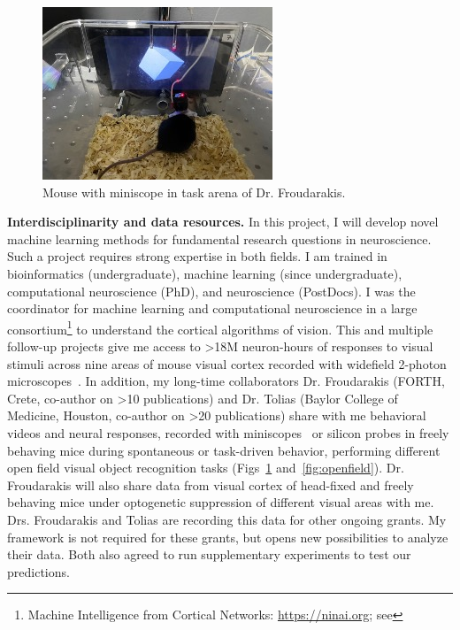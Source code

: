 \documentclass[COG,11pt]{ercgrant}
\begin{document}
\begin{figure}
\vspace{-1.8ex}
\includegraphics[width=\linewidth,trim=25 15 10 30, clip]{figures/miniscope.jpg}
\caption{Mouse with miniscope in task arena of Dr. Froudarakis.}
\label{fig:miniscope}
\end{figure}
\textbf{Interdisciplinarity and data resources.} In this project, I will develop novel machine learning methods for fundamental research questions in neuroscience. Such a project requires strong expertise in both fields. 
I am trained in bioinformatics (undergraduate), machine learning (since undergraduate), computational neuroscience (PhD), and neuroscience (PostDocs). 
I was the coordinator for machine learning and computational neuroscience in a large consortium\footnote{Machine Intelligence from Cortical Networks: \url{https://ninai.org}; see } to understand the cortical algorithms of vision.
This and multiple follow-up projects give me access to >18M neuron-hours of responses to visual stimuli across nine areas of mouse visual cortex recorded with widefield 2-photon microscopes~\parencite{Sofroniew2016-xg}. In addition, my long-time collaborators Dr. Froudarakis (FORTH, Crete, co-author on >10 publications) and Dr. Tolias (Baylor College of Medicine, Houston, co-author on >20  publications) share with me behavioral videos and neural responses, recorded with miniscopes~\parencite[Fig~\ref{fig:miniscope}]{Cai2016-rh} or silicon probes in freely behaving mice during spontaneous or task-driven behavior, performing different open field visual object recognition tasks (Figs~\ref{fig:miniscope} and~\ref{fig:openfield}). Dr. Froudarakis will also share data from visual cortex of head-fixed and freely behaving mice under optogenetic suppression of different visual areas with me. Drs. Froudarakis and Tolias are recording this data for other ongoing grants. My framework is not required for these grants, but opens new possibilities to analyze their data.
Both also agreed to run supplementary experiments to test our predictions.
\end{document}
